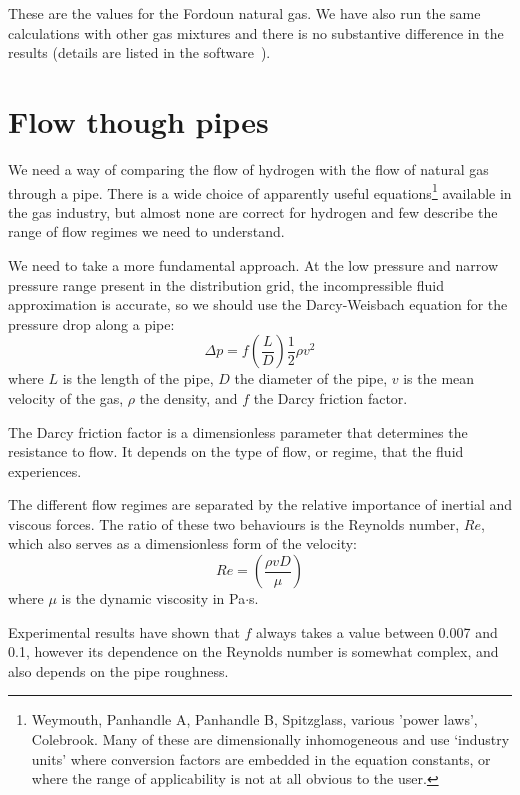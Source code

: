 \documentclass[5p]{elsarticle} %
\begin{document}
These are the values for the Fordoun natural gas. 
We have also run the same calculations with other gas mixtures and there is no substantive difference in the results (details are listed in the software~\cite{Sargents_github}).

\section{Flow though pipes}
\label{sec:flow}

We need a way of comparing the flow of hydrogen with the flow of natural gas through a pipe. 
There is a wide choice of apparently useful equations\footnote{
Weymouth, Panhandle A, Panhandle B, Spitzglass, various 'power laws', Colebrook\citep{Allen2007, She2012}. Many of these are dimensionally inhomogeneous and use `industry units' where conversion factors are embedded in the equation constants, or where the range of applicability is not at all obvious to the user.
}
available in the gas industry, but almost none are correct for hydrogen and few describe the range of flow regimes we need to understand.

We need to take a more fundamental approach.
At the low pressure and narrow pressure range present in the distribution grid, the incompressible fluid approximation is accurate\citep{Perry2008}, so we should use the
Darcy-Weisbach equation for the pressure drop along a pipe:
\begin{equation}
\label{eqn:darcywiesbach}
\Delta p = f \left( \frac{L}{D} \right) \frac{1}{2} \rho v^2
\end{equation}
where $L$ is the length of the pipe,  $D$ the diameter of the pipe,  $v$ is the mean velocity of the gas, $\rho$ the density, and $f$ the Darcy friction factor.

The Darcy friction factor is a dimensionless parameter that determines the resistance to flow. 
It depends on the type of flow, or regime, that the fluid experiences.

The different flow regimes are separated by the relative importance of inertial and viscous forces.
The ratio of these two behaviours is the Reynolds number, $Re$, which also serves as a dimensionless form of the velocity:
\begin{equation}
\label{eqn:re}
Re =  \left ( \frac{\rho v D}{\mu}\right )
\end{equation}
where $\mu$ is the dynamic viscosity in Pa$\cdot$s.

Experimental results  have shown that $f$ always takes a value between 0.007 and 0.1, however its dependence on the Reynolds number is somewhat complex\citep{Allen2007}, and also depends on the pipe roughness.
\end{document}
